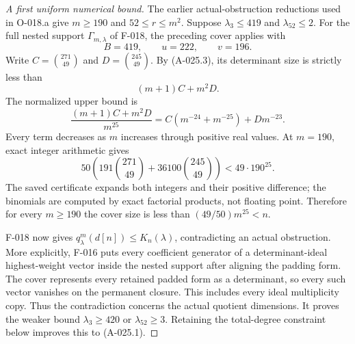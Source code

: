 \begin{proof}[A first uniform numerical bound]
The earlier actual-obstruction reductions used in O-018.a
give $m\geq190$ and $52\leq r\leq m^2$. Suppose
$\lambda_3\leq419$ and $\lambda_{52}\leq2$.
For the full nested support $\Gamma_{m,\lambda}$ of F-018,
the preceding cover applies with
\[
                         B=419,\qquad u=222,\qquad v=196.
\]
Write $C=\binom{271}{49}$ and $D=\binom{245}{49}$.
By (A-025.3), its determinant size is strictly less than
\[
                            (m+1)C+m^2D.
\]
The normalized upper bound is
\[
              \frac{(m+1)C+m^2D}{m^{25}}
                        =C(m^{-24}+m^{-25})+Dm^{-23}.
\]
Every term decreases as $m$ increases through positive real
values. At $m=190$, exact integer arithmetic gives
\[
       50\left(191\binom{271}{49}
                    +36100\binom{245}{49}\right)<49\cdot190^{25}.
                                                         \tag{A-025.4}
\]
The saved certificate expands both integers and their positive
difference; the binomials are computed by exact factorial
products, not floating point. Therefore for every $m\geq190$
the cover size is less than $(49/50)m^{25}<n$.

F-018 now gives $q^m_\lambda(d[n])\leq K_n(\lambda)$,
contradicting an actual obstruction. More explicitly, F-016
puts every coefficient generator of a determinant-ideal
highest-weight vector inside the nested support after aligning
the padding form. The cover represents every retained padded
form as a determinant, so every such vector vanishes on the
permanent closure. This includes every ideal multiplicity copy.
Thus the contradiction concerns the actual quotient dimensions.
It proves the weaker bound $\lambda_3\geq420$ or
$\lambda_{52}\geq3$. Retaining the total-degree constraint
below improves this to (A-025.1).
\end{proof}

